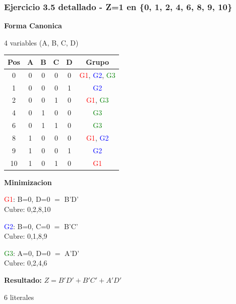 \documentclass[12pt,a4paper]{article}
\begin{document}
\vspace{0.5cm}

\subsubsection{Ejercicio 3.5 detallado - Z=1 en \{0, 1, 2, 4, 6, 8, 9, 10\}}

\vspace{0.3cm}

\begin{minipage}[t]{0.58\textwidth}
\textbf{Forma Canonica}

4 variables (A, B, C, D)

\begin{tabular}{|c|c|c|c|c|c|}
\hline
Pos & A & B & C & D & Grupo \\
\hline
0  & 0 & 0 & 0 & 0 & \textcolor{red}{G1}, \textcolor{blue}{G2}, \textcolor{green}{G3} \\
1  & 0 & 0 & 0 & 1 & \textcolor{blue}{G2} \\
2  & 0 & 0 & 1 & 0 & \textcolor{red}{G1}, \textcolor{green}{G3} \\
4  & 0 & 1 & 0 & 0 & \textcolor{green}{G3} \\
6  & 0 & 1 & 1 & 0 & \textcolor{green}{G3} \\
8  & 1 & 0 & 0 & 0 & \textcolor{red}{G1}, \textcolor{blue}{G2} \\
9  & 1 & 0 & 0 & 1 & \textcolor{blue}{G2} \\
10 & 1 & 0 & 1 & 0 & \textcolor{red}{G1} \\
\hline
\end{tabular}
\end{minipage}
\hspace{0.3cm}
\begin{minipage}[t]{0.38\textwidth}
\textbf{Minimizacion}

\vspace{0.2cm}
\textcolor{red}{G1}: B=0, D=0 $=$ B'D' \\ Cubre: 0,2,8,10

\vspace{0.2cm}
\textcolor{blue}{G2}: B=0, C=0 $=$ B'C' \\ Cubre: 0,1,8,9

\vspace{0.2cm}
\textcolor{green}{G3}: A=0, D=0 $=$ A'D' \\ Cubre: 0,2,4,6

\vspace{0.3cm}
\textbf{Resultado:} $Z = B'D' + B'C' + A'D'$

6 literales
\end{minipage}
\end{document}
